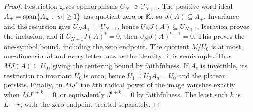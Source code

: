 \begin{proof}
Restriction gives epimorphisms $C_N\twoheadrightarrow C_{N+1}$. The positive-word ideal $A_+=\operatorname{span}\{A_w:|w|\ge1\}$ has quotient zero or $\mathbb K$, so $J(A)\subseteq A_+$. Invariance and the recursion give $U_NA_+=U_{N+1}$, hence $U_NJ(A)\subseteq U_{N+1}$. Iteration proves the inclusion, and if $U_{N+1}J(A)^k=0$, then $U_NJ(A)^{k+1}=0$. This proves the one-symbol bound, including the zero endpoint. The quotient $M/U_0$ is at most one-dimensional and every letter acts as the identity; it is semisimple. Thus $MJ(A)\subseteq U_0$, giving the centering bound by faithfulness. If $A_a$ is invertible, its restriction to invariant $U_0$ is onto; hence $U_1\supseteq U_0A_a=U_0$ and the plateau persists. Finally, on $MJ^r$ the $k$th radical power of the image vanishes exactly when $MJ^{r+k}=0$, or equivalently $J^{r+k}=0$ by faithfulness. The least such $k$ is $L-r$, with the zero endpoint treated separately.
\end{proof}
